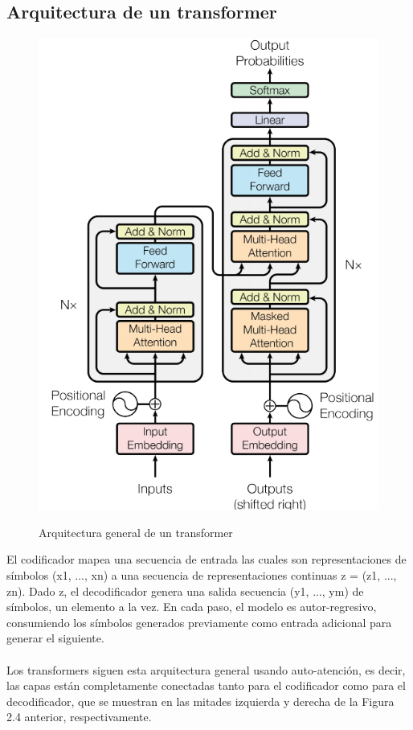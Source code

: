 \documentclass[12pt, a4paper, titlepage]{report}
\begin{document}
		   		\subsection{Arquitectura de un transformer} 
		   		
		   		\begin{figure}[H] 
		   			\includegraphics[width=12cm]{./imagenes/MarcoTeorico/Transformerarchitecture.png}\label{ArqTransformer}
		   			\centering 
		   			\caption{Arquitectura general de un transformer \cite{refArqTransformer}}
		   		\end{figure}     
		        El codificador mapea una secuencia de entrada las cuales son representaciones de símbolos (x1, ..., xn) a una secuencia de representaciones continuas z = (z1, ..., zn). Dado z, el decodificador genera una salida secuencia (y1, ..., ym) de símbolos, un elemento a la vez. En cada paso, el modelo es autor-regresivo, consumiendo los símbolos generados previamente como entrada adicional para generar el siguiente.\\\\
		        Los transformers siguen esta arquitectura general usando auto-atención, es decir, las capas están completamente conectadas tanto para el codificador como para el decodificador, que se muestran en las mitades izquierda y derecha de la Figura 2.4 anterior, respectivamente. \cite{refArqTransformer}
        
\end{document}
